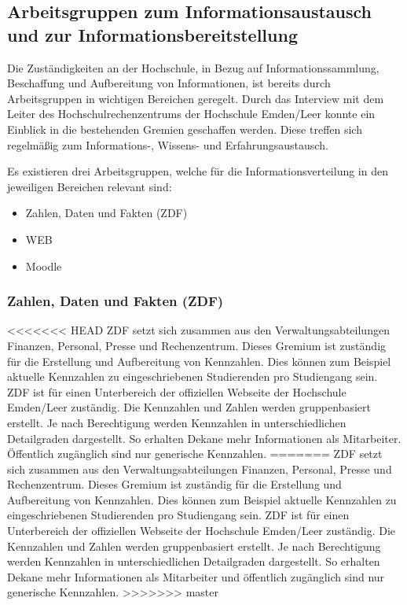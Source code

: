 \subsection{Arbeitsgruppen zum Informationsaustausch und zur Informationsbereitstellung}
\label{subsection_arbeitsgruppen_informationsaustausch}
Die Zuständigkeiten an der Hochschule, in Bezug auf Informationssammlung, Beschaffung und Aufbereitung von Informationen, ist bereits durch Arbeitsgruppen in wichtigen Bereichen geregelt. Durch das Interview mit dem Leiter des Hochschulrechenzentrums der Hochschule Emden/Leer konnte ein Einblick in die bestehenden Gremien geschaffen werden. Diese treffen sich regelmäßig zum Informations-, Wissens- und Erfahrungsaustausch.

Es existieren drei Arbeitsgruppen, welche für die Informationsverteilung in den jeweiligen Bereichen relevant sind:

\begin{itemize}
	\item Zahlen, Daten und Fakten (ZDF)
	\item WEB
	\item Moodle
\end{itemize}

\subsubsection{Zahlen, Daten und Fakten (ZDF)}
<<<<<<< HEAD
ZDF setzt sich zusammen aus den Verwaltungsabteilungen Finanzen, Personal, Presse und Rechenzentrum. Dieses Gremium ist zuständig für die Erstellung und Aufbereitung von Kennzahlen. Dies können zum Beispiel aktuelle Kennzahlen zu eingeschriebenen Studierenden pro Studiengang sein.  ZDF ist für einen Unterbereich der offiziellen Webseite der Hochschule Emden/Leer zuständig. Die Kennzahlen und Zahlen werden gruppenbasiert erstellt. Je nach Berechtigung werden Kennzahlen in unterschiedlichen Detailgraden dargestellt. So erhalten Dekane mehr Informationen als Mitarbeiter. Öffentlich zugänglich sind nur generische Kennzahlen. 
=======
ZDF setzt sich zusammen aus den Verwaltungsabteilungen Finanzen, Personal, Presse und Rechenzentrum. Dieses Gremium ist zuständig für die Erstellung und Aufbereitung von Kennzahlen. Dies können zum Beispiel aktuelle Kennzahlen zu eingeschriebenen Studierenden pro Studiengang sein.  ZDF ist für einen Unterbereich der offiziellen Webseite der Hochschule Emden/Leer zuständig. Die Kennzahlen und Zahlen werden gruppenbasiert erstellt. Je nach Berechtigung werden Kennzahlen in unterschiedlichen Detailgraden dargestellt. So erhalten Dekane mehr Informationen als Mitarbeiter und öffentlich zugänglich sind nur generische Kennzahlen. 
>>>>>>> master

